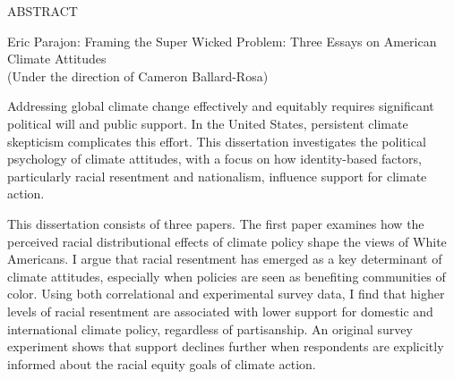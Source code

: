 
\begin{center}
\vspace*{52pt}
{ABSTRACT}
\vspace{11pt}

\begin{singlespace}
Eric Parajon: Framing the Super Wicked Problem: Three Essays on American Climate Attitudes \\
(Under the direction of Cameron Ballard-Rosa)
\end{singlespace}
\end{center}


Addressing global climate change effectively and equitably requires significant political will and public support. In the United States, persistent climate skepticism complicates this effort. This dissertation investigates the political psychology of climate attitudes, with a focus on how identity-based factors, particularly racial resentment and nationalism, influence support for climate action.

This dissertation consists of three papers. The first paper examines how the perceived racial distributional effects of climate policy shape the views of White Americans. I argue that racial resentment has emerged as a key determinant of climate attitudes, especially when policies are seen as benefiting communities of color. Using both correlational and experimental survey data, I find that higher levels of racial resentment are associated with lower support for domestic and international climate policy, regardless of partisanship. An original survey experiment shows that support declines further when respondents are explicitly informed about the racial equity goals of climate action.

